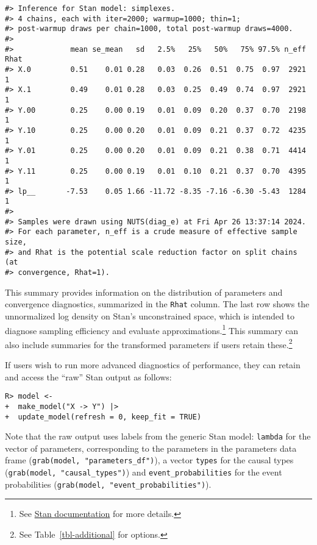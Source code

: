 \documentclass[
  11pt,
  article]{jss}
\begin{document}
\begin{verbatim}
#> Inference for Stan model: simplexes.
#> 4 chains, each with iter=2000; warmup=1000; thin=1; 
#> post-warmup draws per chain=1000, total post-warmup draws=4000.
#> 
#>             mean se_mean   sd   2.5%   25%   50%   75% 97.5% n_eff Rhat
#> X.0         0.51    0.01 0.28   0.03  0.26  0.51  0.75  0.97  2921    1
#> X.1         0.49    0.01 0.28   0.03  0.25  0.49  0.74  0.97  2921    1
#> Y.00        0.25    0.00 0.19   0.01  0.09  0.20  0.37  0.70  2198    1
#> Y.10        0.25    0.00 0.20   0.01  0.09  0.21  0.37  0.72  4235    1
#> Y.01        0.25    0.00 0.20   0.01  0.09  0.21  0.38  0.71  4414    1
#> Y.11        0.25    0.00 0.19   0.01  0.10  0.21  0.37  0.70  4395    1
#> lp__       -7.53    0.05 1.66 -11.72 -8.35 -7.16 -6.30 -5.43  1284    1
#> 
#> Samples were drawn using NUTS(diag_e) at Fri Apr 26 13:37:14 2024.
#> For each parameter, n_eff is a crude measure of effective sample size,
#> and Rhat is the potential scale reduction factor on split chains (at 
#> convergence, Rhat=1).
\end{verbatim}

This summary provides information on the distribution of parameters and
convergence diagnostics, summarized in the \texttt{Rhat} column. The
last row shows the unnormalized log density on Stan's unconstrained
space, which is intended to diagnose sampling efficiency and evaluate
approximations.\footnote{See
  \href{https://mc-stan.org/cmdstanr/reference/fit-method-lp.html}{Stan
  documentation} for more details.} This summary can also include
summaries for the transformed parameters if users retain
these.\footnote{See Table~\ref{tbl-additional} for options.}

If users wish to run more advanced diagnostics of performance, they can
retain and access the ``raw'' Stan output as follows:

\begin{verbatim}
R> model <- 
+  make_model("X -> Y") |> 
+  update_model(refresh = 0, keep_fit = TRUE)
\end{verbatim}

Note that the raw output uses labels from the generic Stan model:
\texttt{lambda} for the vector of parameters, corresponding to the
parameters in the parameters data frame
(\texttt{grab(model,\ "parameters\_df")}), a vector \texttt{types} for
the causal types (\texttt{grab(model,\ "causal\_types")}) and
\texttt{event\_probabilities} for the event probabilities
(\texttt{grab(model,\ "event\_probabilities")}).
\end{document}
